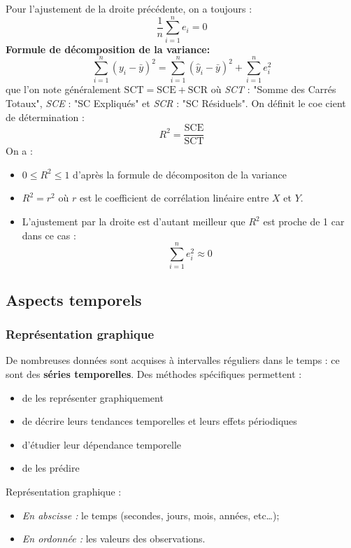 Pour l'ajustement de la droite précédente, on a toujours : 
$$ \frac{1}{n} \sum_{i=1}^{n} e_{i} = 0$$
\textbf{Formule de décomposition de la variance:}
$$\sum_{i=1}^{n}(y_{i}-\bar{y})^{2} = \sum_{i=1}^{n}(\hat{y}_{i}-\bar{y})^{2} + \sum_{i=1}^{n} e_{i}^{2}$$
que l'on note généralement $\textrm{SCT} = \textrm{SCE} + \textrm{SCR}$ où \textit{SCT} : "Somme des Carrés Totaux", \textit{SCE} : "SC Expliqués" et \textit{SCR} : "SC Résiduels".\newline
On définit le coe cient de détermination : 
$$R^{2} = \frac{\textrm{SCE}}{\textrm{SCT}}$$
On a : 
\begin{itemize}
\item $0 \leq R^{2} \leq 1$ d'après la formule de décompositon de la variance
\item $R^{2} = r^{2}$ où $r$ est le coefficient de corrélation linéaire entre $X$ et $Y$.
\item L'ajustement par la droite est d'autant meilleur que $R^{2}$ est proche de 1 car dans ce cas : 
$$ \sum_{i=1}^{n} e_{i}^{2} \approx 0$$
\end{itemize}
\subsection{Aspects temporels}
\subsubsection{Représentation graphique}
De nombreuses données sont acquises à intervalles réguliers dans le temps : ce sont des \textbf{séries temporelles}.\newline
Des méthodes spécifiques permettent :
\begin{itemize}
\item de les représenter graphiquement
\item de décrire leurs tendances temporelles et leurs effets périodiques 
\item d'étudier leur dépendance temporelle
\item de les prédire
\end{itemize}
Représentation graphique :
\begin{itemize}
\item \textit{En abscisse :} le temps (secondes, jours, mois, années, etc\dots); 
\item \textit{En ordonnée :} les valeurs des observations.
\end{itemize}

